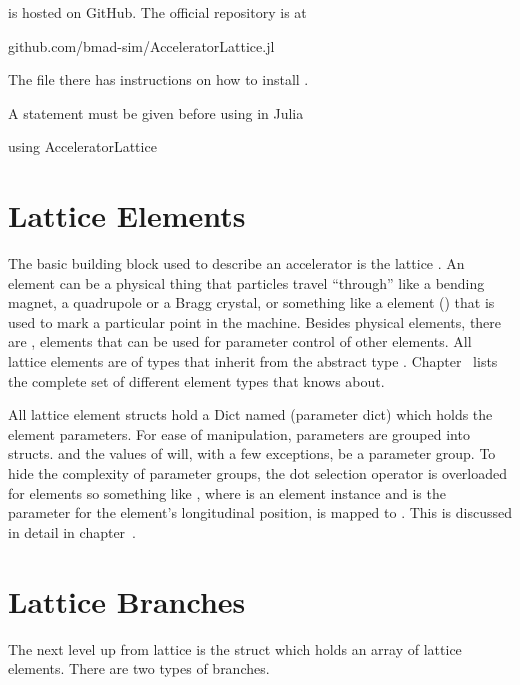 \accellat is hosted on GitHub. The official repository is at
\begin{example}
  github.com/bmad-sim/AcceleratorLattice.jl
\end{example}
The  file there has instructions on how to install \accellat.

A  statement must be given before using \accellat in Julia
\begin{example}
  using AcceleratorLattice
\end{example}

\section{Lattice Elements}
\label{s:element.def}

The basic building block used to describe an accelerator is the lattice . An
element can be a physical thing that particles travel ``through'' like a bending magnet, a
quadrupole or a Bragg crystal, or something like a  element () that is used
to mark a particular point in the machine. Besides physical elements, there are ,
elements that can be used for parameter control of other elements. All lattice elements are of types
that inherit from the abstract type .
Chapter~ lists the complete set of different element types that \bmad knows about.

All lattice element structs hold a Dict named  (parameter dict) which holds the element
parameters. For ease of manipulation, parameters are grouped into   structs.
and the values of  will, with a few exceptions, be a parameter group. 
To hide the complexity of parameter groups, the dot selection operator is overloaded for elements
so something like , where  is an element instance and  is the parameter for the
element's longitudinal position, is mapped to .
This is discussed in detail in chapter~.

\section{Lattice Branches}
\label{s:branch.def}

The next level up from lattice  is the  struct which
holds an array of lattice elements.
There are two types of branches.



